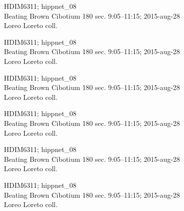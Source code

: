 \documentclass[2pt]{extarticle}
\begin{document}
\noindent
\parbox{0.16\textwidth}{\tiny \raggedright \rule[-0.3\baselineskip]{0pt}{10pt}HDIM6311; hippnet\_08\\ Beating Brown Cibotium 180 sec. 9:05--11:15; 2015-aug-28\\ Loreo Loreto coll.}
\parbox{0.16\textwidth}{\tiny \raggedright \rule[-0.3\baselineskip]{0pt}{10pt}HDIM6311; hippnet\_08\\ Beating Brown Cibotium 180 sec. 9:05--11:15; 2015-aug-28\\ Loreo Loreto coll.}
\parbox{0.16\textwidth}{\tiny \raggedright \rule[-0.3\baselineskip]{0pt}{10pt}HDIM6311; hippnet\_08\\ Beating Brown Cibotium 180 sec. 9:05--11:15; 2015-aug-28\\ Loreo Loreto coll.}
\parbox{0.16\textwidth}{\tiny \raggedright \rule[-0.3\baselineskip]{0pt}{10pt}HDIM6311; hippnet\_08\\ Beating Brown Cibotium 180 sec. 9:05--11:15; 2015-aug-28\\ Loreo Loreto coll.}
\parbox{0.16\textwidth}{\tiny \raggedright \rule[-0.3\baselineskip]{0pt}{10pt}HDIM6311; hippnet\_08\\ Beating Brown Cibotium 180 sec. 9:05--11:15; 2015-aug-28\\ Loreo Loreto coll.}
\parbox{0.16\textwidth}{\tiny \raggedright \rule[-0.3\baselineskip]{0pt}{10pt}HDIM6311; hippnet\_08\\ Beating Brown Cibotium 180 sec. 9:05--11:15; 2015-aug-28\\ Loreo Loreto coll.} \\ 
\vspace{0.001in} 
\end{document}
